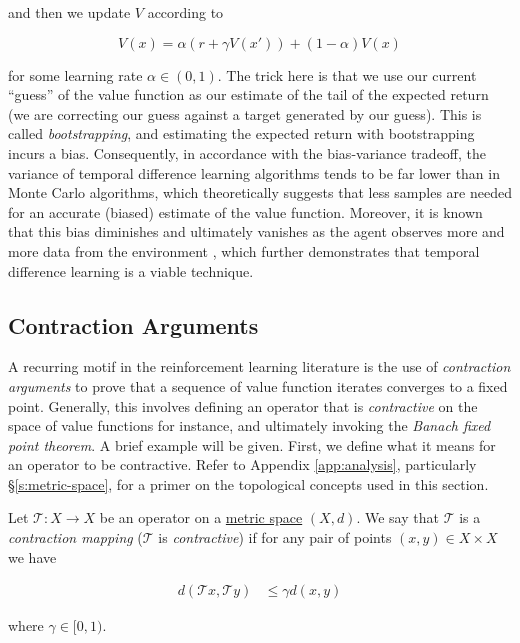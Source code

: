and then we update $V$ according to

\begin{equation*}
  V(x) = \alpha(r + \gamma V(x')) + (1-\alpha)V(x)
\end{equation*}

for some learning rate $\alpha\in(0,1)$. The trick here is that we use our
current ``guess'' of the value
function as our estimate of the tail of the expected return (we are
correcting our guess against a target generated by our guess). This is
called \emph{bootstrapping}, and estimating the expected
return with bootstrapping incurs a bias. Consequently, in accordance
with the bias-variance tradeoff, the variance of temporal difference
learning algorithms tends to be far lower than in Monte Carlo
algorithms, which theoretically suggests that less samples are needed
for an accurate (biased) estimate of the value function. Moreover, it
is known that this bias diminishes and ultimately vanishes as the agent observes
more and more data from the environment \citep{sutton2018reinforcement}, which further
demonstrates that temporal difference learning is a viable technique.

\subsection{Contraction Arguments}\label{s:background:rl:contraction}
A recurring motif in the reinforcement learning literature is the use
of \emph{contraction arguments} to prove that a sequence of value
function iterates converges to a fixed point. Generally, this involves
defining an operator that is \emph{contractive} on the space of value
functions for instance, and ultimately invoking the \emph{Banach fixed
  point theorem}. A brief example will be given. First, we define what
it means for an operator to be contractive. Refer to Appendix
\ref{app:analysis}, particularly \S\ref{s:metric-space}, for a primer on the
topological concepts used in this section.

\begin{definition}\label{def:contraction}
  Let $\mathcal{T}:X\to X$ be an operator on a
  \hyperref[def:metric-space]{metric space} $(X, d)$. We say that
  $\mathcal{T}$ is a \emph{contraction mapping} ($\mathcal{T}$ is
  \emph{contractive}) if for any pair of points $(x, y)\in X\times X$
  we have

  \begin{align*}
    d(\mathcal{T}x, \mathcal{T}y) &\leq \gamma d(x, y)
  \end{align*}

  where $\gamma\in [0,1)$.
\end{definition}

